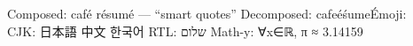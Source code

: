 Composed: café résumé — “smart quotes”
Decomposed: cafe\'e\nre\'sume\'
Emoji: 🚀 🎉
CJK: 日本語 中文 한국어
RTL: שלום
Math-y: ∀x∈ℝ, π ≈ 3.14159
